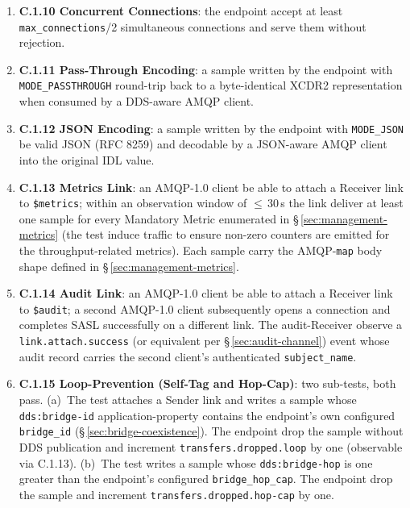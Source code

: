 \documentclass{../styles/zerodds-vendor-spec}
\begin{document}
\begin{enumerate}
        closed by the endpoint with a \texttt{close} performative
        carrying error condition
        \texttt{amqp:resource-limit-exceeded} or
        \texttt{amqp:connection:framing-error}.
  \item \textbf{C.1.10 Concurrent Connections}: the endpoint
         accept at least
        \texttt{max\_connections}/2 simultaneous connections and
        serve them without rejection.
  \item \textbf{C.1.11 Pass-Through Encoding}: a sample written by
        the endpoint with \texttt{MODE\_PASSTHROUGH} 
        round-trip back to a byte-identical XCDR2 representation
        when consumed by a DDS-aware AMQP client.
  \item \textbf{C.1.12 JSON Encoding}: a sample written by the
        endpoint with \texttt{MODE\_JSON}  be valid
        JSON (RFC 8259) and decodable by a JSON-aware AMQP
        client into the original IDL value.
  \item \textbf{C.1.13 Metrics Link}: an AMQP-1.0 client
         be able to attach a Receiver link to
        \texttt{\$metrics}; within an observation window of
        $\le$\,30\,s the link  deliver at least one
        sample for every Mandatory Metric enumerated in
        \S\,\ref{sec:management-metrics} (the test 
        induce traffic to ensure non-zero counters are emitted
        for the throughput-related metrics). Each sample
         carry the AMQP-\texttt{map} body shape
        defined in \S\,\ref{sec:management-metrics}.
  \item \textbf{C.1.14 Audit Link}: an AMQP-1.0 client
         be able to attach a Receiver link to
        \texttt{\$audit}; a second AMQP-1.0 client subsequently
        opens a connection and completes SASL successfully on
        a different link. The audit-Receiver 
        observe a \texttt{link.attach.success} (or equivalent
        per \S\,\ref{sec:audit-channel}) event whose audit
        record carries the second client's authenticated
        \texttt{subject\_name}.
  \item \textbf{C.1.15 Loop-Prevention (Self-Tag and Hop-Cap)}:
        two sub-tests, both  pass.
        (a)~The test attaches a Sender link and writes a
        sample whose \texttt{dds:bridge-id} application-property
        contains the endpoint's own configured \texttt{bridge\_id}
        (\S\,\ref{sec:bridge-coexistence}). The endpoint
         drop the sample without DDS publication
        and  increment
        \texttt{transfers.dropped.loop} by one (observable via
        C.1.13).
        (b)~The test writes a sample whose \texttt{dds:bridge-hop}
        is one greater than the endpoint's configured
        \texttt{bridge\_hop\_cap}. The endpoint 
        drop the sample and  increment
        \texttt{transfers.dropped.hop-cap} by one.
\end{enumerate}
\end{document}
